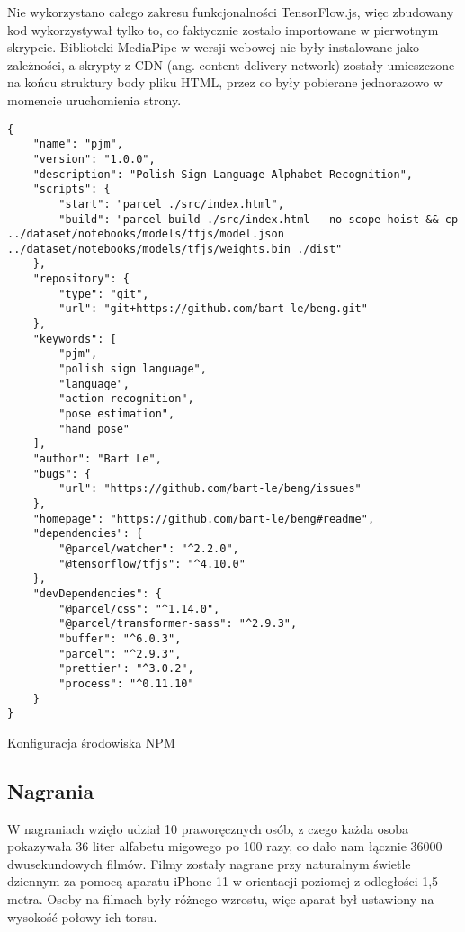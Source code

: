 Nie wykorzystano całego zakresu funkcjonalności TensorFlow.js, więc zbudowany kod wykorzystywał tylko to, co faktycznie zostało importowane w pierwotnym skrypcie. Biblioteki MediaPipe w wersji webowej nie były instalowane jako zależności, a skrypty z CDN (ang. content delivery network) zostały umieszczone na końcu struktury body pliku HTML, przez co były pobierane jednorazowo w momencie uruchomienia strony.

\begin{listing}[H]
    \color{white}
    \begin{verbatim}
{
    "name": "pjm",
    "version": "1.0.0",
    "description": "Polish Sign Language Alphabet Recognition",
    "scripts": {
        "start": "parcel ./src/index.html",
        "build": "parcel build ./src/index.html --no-scope-hoist && cp ../dataset/notebooks/models/tfjs/model.json ../dataset/notebooks/models/tfjs/weights.bin ./dist"
    },
    "repository": {
        "type": "git",
        "url": "git+https://github.com/bart-le/beng.git"
    },
    "keywords": [
        "pjm",
        "polish sign language",
        "language",
        "action recognition",
        "pose estimation",
        "hand pose"
    ],
    "author": "Bart Le",
    "bugs": {
        "url": "https://github.com/bart-le/beng/issues"
    },
    "homepage": "https://github.com/bart-le/beng#readme",
    "dependencies": {
        "@parcel/watcher": "^2.2.0",
        "@tensorflow/tfjs": "^4.10.0"
    },
    "devDependencies": {
        "@parcel/css": "^1.14.0",
        "@parcel/transformer-sass": "^2.9.3",
        "buffer": "^6.0.3",
        "parcel": "^2.9.3",
        "prettier": "^3.0.2",
        "process": "^0.11.10"
    }
}
    \end{verbatim}
    \caption{Konfiguracja środowiska NPM}
    \label{lst:npm-environment-configuration}
\end{listing}

\subsection{Nagrania}
\label{subsec:recordings}

W nagraniach wzięło udział 10 praworęcznych osób, z czego każda osoba pokazywała 36 liter alfabetu migowego po 100 razy, co dało nam łącznie 36000 dwusekundowych filmów. Filmy zostały nagrane przy naturalnym świetle dziennym za pomocą aparatu iPhone 11 w orientacji poziomej z odległości 1,5 metra. Osoby na filmach były różnego wzrostu, więc aparat był ustawiony na wysokość połowy ich torsu.

